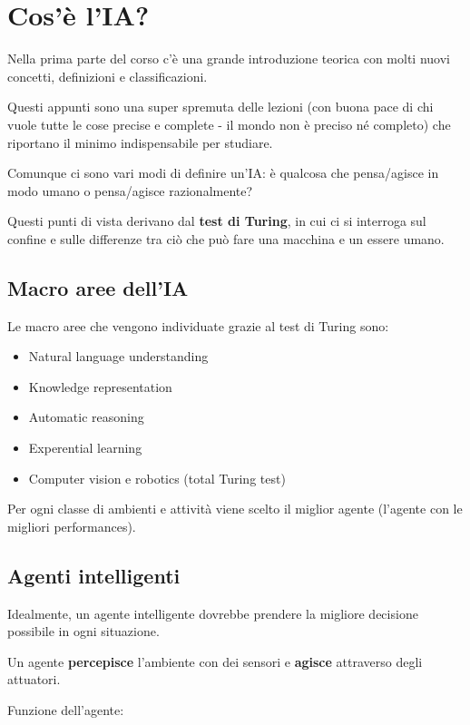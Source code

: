 \newpage

\section{Cos'è l'IA?}

Nella prima parte del corso c'è una grande introduzione teorica con molti
nuovi concetti, definizioni e classificazioni.

Questi appunti sono una super spremuta delle lezioni (con buona pace di chi
vuole tutte le cose precise e complete - il mondo non è preciso né completo)
che riportano il minimo indispensabile per studiare.

Comunque ci sono vari modi di definire un'IA: è qualcosa che pensa/agisce
in modo umano o pensa/agisce razionalmente?

Questi punti di vista derivano dal \textbf{test di Turing}, in cui ci si
interroga sul confine e sulle differenze tra ciò che può fare una macchina
e un essere umano.

\subsection{Macro aree dell'IA}

Le macro aree che vengono individuate grazie al test di Turing sono:

\begin{itemize}
 \item Natural language understanding
 \item Knowledge representation
 \item Automatic reasoning
 \item Experential learning
 \item Computer vision e robotics (total Turing test)
\end{itemize}

Per ogni classe di ambienti e attività viene scelto il miglior agente (l'agente
con le migliori performances).

\subsection{Agenti intelligenti}

Idealmente, un agente intelligente dovrebbe prendere la migliore decisione
possibile in ogni situazione.

Un agente \textbf{percepisce} l'ambiente con dei sensori e \textbf{agisce}
attraverso degli attuatori.

Funzione dell'agente:

